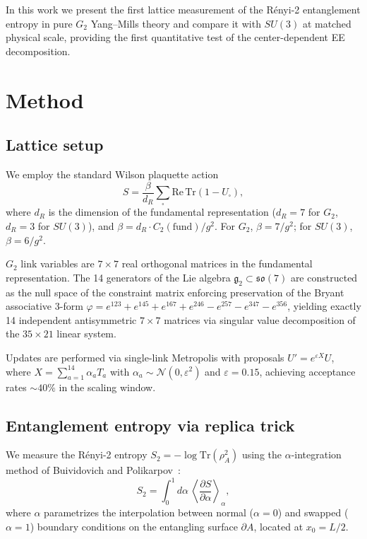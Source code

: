 \documentclass[twocolumn,prd,nofootinbib]{revtex4-2}
\begin{document}
In this work we present the first lattice measurement of the R\'enyi-2 entanglement entropy in pure $G_2$ Yang--Mills theory and compare it with $SU(3)$ at matched physical scale, providing the first quantitative test of the center-dependent EE decomposition.

\section{Method}

\subsection{Lattice setup}

We employ the standard Wilson plaquette action
\begin{equation}
S = \frac{\beta}{d_R} \sum_{\square} \mathrm{Re}\,\mathrm{Tr}\left(1 - U_\square\right),
\end{equation}
where $d_R$ is the dimension of the fundamental representation ($d_R = 7$ for $G_2$, $d_R = 3$ for $SU(3)$), and $\beta = d_R \cdot C_2(\mathrm{fund})/g^2$. For $G_2$, $\beta = 7/g^2$; for $SU(3)$, $\beta = 6/g^2$.

$G_2$ link variables are $7 \times 7$ real orthogonal matrices in the fundamental representation. The 14 generators of the Lie algebra $\mathfrak{g}_2 \subset \mathfrak{so}(7)$ are constructed as the null space of the constraint matrix enforcing preservation of the Bryant associative 3-form $\varphi = e^{123} + e^{145} + e^{167} + e^{246} - e^{257} - e^{347} - e^{356}$, yielding exactly 14 independent antisymmetric $7 \times 7$ matrices via singular value decomposition of the $35 \times 21$ linear system.

Updates are performed via single-link Metropolis with proposals $U' = e^{\varepsilon X} U$, where $X = \sum_{a=1}^{14} \alpha_a T_a$ with $\alpha_a \sim \mathcal{N}(0, \varepsilon^2)$ and $\varepsilon = 0.15$, achieving acceptance rates $\sim 40\%$ in the scaling window.

\subsection{Entanglement entropy via replica trick}

We measure the R\'enyi-2 entropy $S_2 = -\log \mathrm{Tr}(\rho_A^2)$ using the $\alpha$-integration method of Buividovich and Polikarpov~\cite{Buividovich2008}:
\begin{equation}
S_2 = \int_0^1 d\alpha\, \left\langle \frac{\partial S}{\partial \alpha} \right\rangle_\alpha,
\end{equation}
where $\alpha$ parametrizes the interpolation between normal ($\alpha = 0$) and swapped ($\alpha = 1$) boundary conditions on the entangling surface $\partial A$, located at $x_0 = L/2$.
\end{document}
